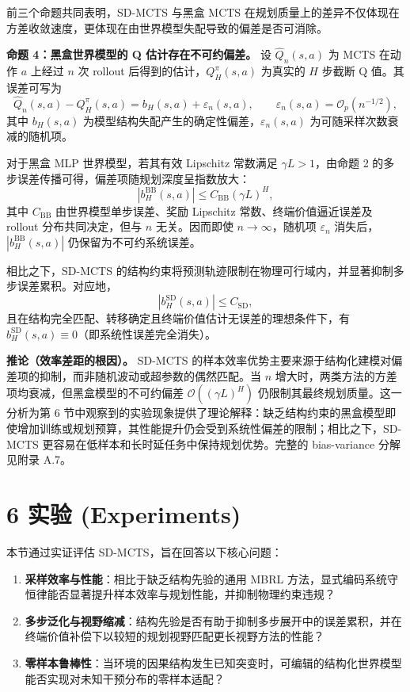 \documentclass[UTF8]{ctexart}
\begin{document}
前三个命题共同表明，SD-MCTS 与黑盒 MCTS 在规划质量上的差异不仅体现在方差收敛速度，更体现在由世界模型失配导致的偏差是否可消除。

\textbf{命题 4：黑盒世界模型的 Q 估计存在不可约偏差。} 设 $\hat{Q}_{n}(s,a)$ 为 MCTS 在动作 $a$ 上经过 $n$ 次 rollout 后得到的估计，$Q_H^\pi(s,a)$ 为真实的 $H$ 步截断 Q 值。其误差可写为
\[
\hat{Q}_{n}(s,a)-Q_H^\pi(s,a)=b_H(s,a)+\varepsilon_n(s,a),\qquad \varepsilon_n(s,a)=\mathcal{O}_p(n^{-1/2}),
\]
其中 $b_H(s,a)$ 为模型结构失配产生的确定性偏差，$\varepsilon_n(s,a)$ 为可随采样次数衰减的随机项。

对于黑盒 MLP 世界模型，若其有效 Lipschitz 常数满足 $\gamma L>1$，由命题 2 的多步误差传播可得，偏差项随规划深度呈指数放大：
\[
\left|b_H^{\mathrm{BB}}(s,a)\right|\le C_{\mathrm{BB}}(\gamma L)^H,
\]
其中 $C_{\mathrm{BB}}$ 由世界模型单步误差、奖励 Lipschitz 常数、终端价值逼近误差及 rollout 分布共同决定，但与 $n$ 无关。因而即使 $n\to\infty$，随机项 $\varepsilon_n$ 消失后，$\left|b_H^{\mathrm{BB}}(s,a)\right|$ 仍保留为不可约系统误差。

相比之下，SD-MCTS 的结构约束将预测轨迹限制在物理可行域内，并显著抑制多步误差累积。对应地，
\[
\left|b_H^{\mathrm{SD}}(s,a)\right|\le C_{\mathrm{SD}},
\]
且在结构完全匹配、转移确定且终端价值估计无误差的理想条件下，有 $b_H^{\mathrm{SD}}(s,a)\equiv 0$（即系统性误差完全消失）。

\textbf{推论（效率差距的根因）。} SD-MCTS 的样本效率优势主要来源于结构化建模对偏差项的抑制，而非随机波动或超参数的偶然匹配。当 $n$ 增大时，两类方法的方差项均衰减，但黑盒模型的不可约偏差 $\mathcal{O}((\gamma L)^H)$ 仍限制其最终规划质量。这一分析为第 6 节中观察到的实验现象提供了理论解释：缺乏结构约束的黑盒模型即使增加训练或规划预算，其性能提升仍会受到系统性偏差的限制；相比之下，SD-MCTS 更容易在低样本和长时延任务中保持规划优势。完整的 bias-variance 分解见附录 A.7。

\hypertarget{ux5b9eux9a8c-experiments}{%
\section{6 实验 (Experiments)}\label{ux5b9eux9a8c-experiments}}

本节通过实证评估 SD-MCTS，旨在回答以下核心问题：

\begin{enumerate}
\item \textbf{采样效率与性能}：相比于缺乏结构先验的通用 MBRL 方法，显式编码系统守恒律能否显著提升样本效率与规划性能，并抑制物理约束违规？
\item \textbf{多步泛化与视野缩减}：结构先验是否有助于抑制多步展开中的误差累积，并在终端价值补偿下以较短的规划视野匹配更长视野方法的性能？
\item \textbf{零样本鲁棒性}：当环境的因果结构发生已知突变时，可编辑的结构化世界模型能否实现对未知干预分布的零样本适配？
\end{enumerate}
\end{document}
